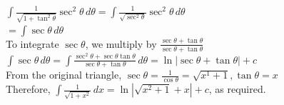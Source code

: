 \documentclass[../main.tex]{subfiles}
\begin{document}
\begin{enumerate}
    \(\int \frac{1}{\sqrt{1+\tan^2{\theta}}}\sec^2{\theta}\,d\theta=\int \frac{1}{\sqrt{\sec^2{\theta}}}\sec^2{\theta}\,d\theta\)\\

    \(=\int \sec{\theta}\,d\theta\)\\

    To integrate \(\sec{\theta}\), we multiply by \(\frac{\sec{\theta}+\tan{\theta}}{\sec{\theta}+\tan{\theta}}\)\\

    \(\int \sec{\theta}\,d\theta=\int \frac{\sec^2{\theta}+\sec{\theta}\tan{\theta}}{\sec{\theta}+\tan{\theta}}\,d\theta=\ln{|\sec{\theta}+\tan{\theta}|}+c\)\\

    From the original triangle, \(\sec{\theta}=\frac{1}{\cos{\theta}}=\sqrt{x^1+1}, \tan{\theta}=x\)\\

    Therefore, \(\int \frac{1}{\sqrt{1+x^2}}\,dx=\ln{|\sqrt{x^2+1}+x|}+c\), as required.\\
    
\end{enumerate}


\pagebreak
\end{document}
